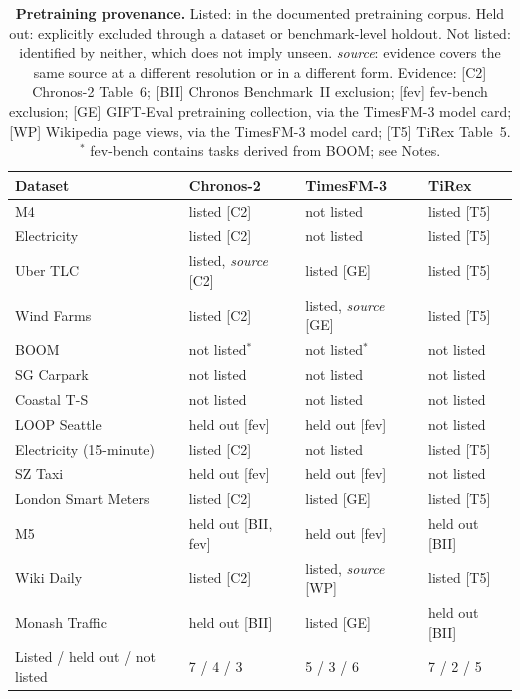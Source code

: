 \documentclass{article} %
\begin{document}
\begin{table}[h]
  \centering
  \small
  \caption{\textbf{Pretraining provenance.} Listed: in the documented pretraining corpus.
  Held out: explicitly excluded through a dataset or benchmark-level holdout. Not listed:
  identified by neither, which does not imply unseen. \emph{source}: evidence covers the same
  source at a different resolution or in a different form. Evidence: [C2] Chronos-2 Table~6;
  [BII] Chronos Benchmark~II exclusion; [fev] fev-bench exclusion; [GE] GIFT-Eval pretraining
  collection, via the TimesFM-3 model card; [WP] Wikipedia page views, via the TimesFM-3 model
  card; [T5] TiRex Table~5. $^{\ast}$ fev-bench contains tasks derived from BOOM; see Notes.}
  \label{tab:provenance}
  \begin{tabular}{@{}llll@{}}
    \toprule
    Dataset & Chronos-2 & TimesFM-3 & TiRex \\
    \midrule
    M4 & listed [C2] & not listed & listed [T5] \\
    Electricity & listed [C2] & not listed & listed [T5] \\
    Uber TLC & listed, \emph{source} [C2] & listed [GE] & listed [T5] \\
    Wind Farms & listed [C2] & listed, \emph{source} [GE] & listed [T5] \\
    BOOM & not listed$^{\ast}$ & not listed$^{\ast}$ & not listed \\
    SG Carpark & not listed & not listed & not listed \\
    Coastal T-S & not listed & not listed & not listed \\
    LOOP Seattle & held out [fev] & held out [fev] & not listed \\
    Electricity (15-minute) & listed [C2] & not listed & listed [T5] \\
    SZ Taxi & held out [fev] & held out [fev] & not listed \\
    London Smart Meters & listed [C2] & listed [GE] & listed [T5] \\
    M5 & held out [BII, fev] & held out [fev] & held out [BII] \\
    Wiki Daily & listed [C2] & listed, \emph{source} [WP] & listed [T5] \\
    Monash Traffic & held out [BII] & listed [GE] & held out [BII] \\
    \midrule
    Listed / held out / not listed & 7 / 4 / 3 & 5 / 3 / 6 & 7 / 2 / 5 \\
    \bottomrule
  \end{tabular}
\end{table}
\end{document}
